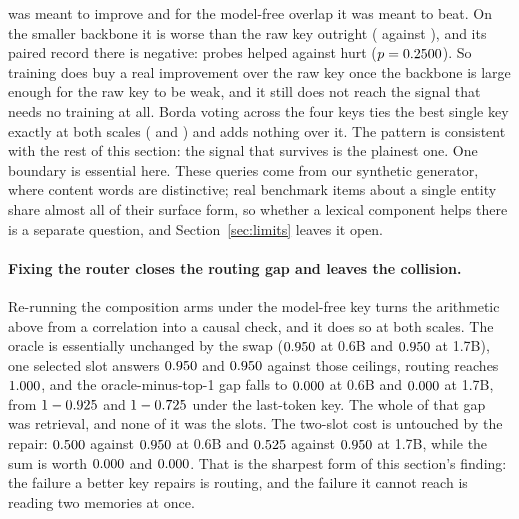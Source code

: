 \documentclass[11pt]{article}
\begin{document}
was meant to improve and \tKeyBestTopLarge{} for the model-free overlap it was meant to
beat. On the smaller backbone it is worse than the raw key outright (\tKeyLearnedTop{}
against \tKeyLastTop{}), and its paired record there is negative: \tKeyPairLearnedHelped{}
probes helped against \tKeyPairLearnedHurt{} hurt ($p = 0.2500{}$). So training
does buy a real improvement over the raw key once the backbone is
large enough for the raw key to be weak, and it still does not reach the signal that needs
no training at all. Borda voting across the four keys ties the best single key exactly at
both scales (\tKeyVoteTop{} and \tKeyVoteTopLarge{}) and adds nothing over it. The pattern
is consistent with the rest of this section: the signal that survives is the plainest
one. One boundary is essential here. These queries come from our synthetic generator,
where content words are distinctive; real benchmark items about a single entity share
almost all of their surface form, so whether a lexical component helps there is a
separate question, and Section~\ref{sec:limits} leaves it open.

\paragraph{Fixing the router closes the routing gap and leaves the collision.} Re-running
the composition arms under the model-free key turns the arithmetic above from a
correlation into a causal check, and it does so at both scales. The oracle is essentially
unchanged by the swap ($0.950{}$ at 0.6B and $0.950{}$ at 1.7B), one
selected slot answers $0.950{}$ and $0.950{}$ against those ceilings,
routing reaches $1.000{}$, and the oracle-minus-top-1 gap falls to $0.000{}$
at 0.6B and $0.000{}$ at 1.7B, from $1-0.925{}$ and $1-0.725{}$ under
the last-token key. The whole of that gap was retrieval, and none of it was the slots. The
two-slot cost is untouched by the repair: $0.500{}$ against
$0.950{}$ at 0.6B and $0.525{}$ against $0.950{}$ at 1.7B, while the
sum is worth $0.000{}$ and $0.000{}$. That is the sharpest form of this
section's finding: the failure a better key repairs is routing, and the failure it cannot
reach is reading two memories at once.
\end{document}
